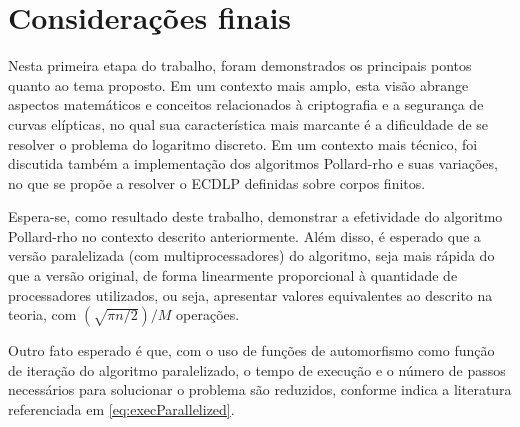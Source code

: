 \chapter{Considerações finais}
Nesta primeira etapa do trabalho, foram demonstrados os principais pontos quanto ao tema proposto. Em um contexto mais amplo, esta visão abrange aspectos matemáticos e conceitos relacionados à criptografia e a segurança de curvas elípticas, no qual sua característica mais marcante é a dificuldade de se resolver o problema do logaritmo discreto. Em um contexto mais técnico, foi discutida também a implementação dos algoritmos Pollard-rho e suas variações, no que se propõe a resolver o ECDLP definidas sobre corpos finitos.

Espera-se, como resultado deste trabalho, demonstrar a efetividade do algoritmo Pollard-rho no contexto descrito anteriormente. Além disso, é esperado que a versão paralelizada (com multiprocessadores) do algoritmo, seja mais rápida do que a versão original, de forma linearmente proporcional à quantidade de processadores utilizados, ou seja, apresentar valores equivalentes ao descrito na teoria, com $(\sqrt{\pi n/2})/M$ operações.

Outro fato esperado é que, com o uso de funções de automorfismo como função de iteração do algoritmo paralelizado, o tempo de execução e o número de passos necessários para solucionar o problema são reduzidos, conforme indica a literatura referenciada em \ref{eq:execParallelized}.
